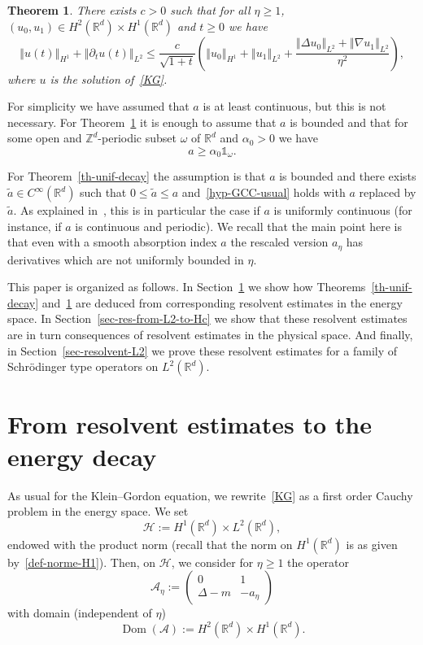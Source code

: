 \documentclass[11pt]{article}
\newtheorem{theo}{Theorem}[section]
\theoremstyle{definition}
\numberwithin{equation}{section}
\numberwithin{figure}{section}
\numberwithin{table}{section}
\newcommand{\nr}[1]{\left\Vert #1\right\Vert}
\renewcommand{\leq}{\leqslant}
\renewcommand{\geq}{\geqslant}
\newcommand{\1}{\mathds 1}
\DeclareMathOperator{\Dom}{Dom}
\newcommand{\R}{\mathbb{R}}
\renewcommand{\a}{\alpha}
\newcommand{\D}{\Delta}
\renewcommand{\o}{\omega}
\newcommand{\Ac}{{\mathcal A}}
\newcommand{\HH}{\mathcal H}
\begin{document}
\begin{theo}\label{th-no-GCC}
There exists $c > 0$ such that for all $\eta \geq 1$, $(u_0,u_1) \in H^2(\R^d) \times H^1(\R^d)$ and $t \geq 0$ we have
\[
\nr{u(t)}_{H^1} + \nr{\partial_t u(t)}_{L^2} \leq \frac c {\sqrt {1+t}} \left(\nr{u_0}_{H^1} + \nr{u_1}_{L^2} + \frac {\nr{\D u_0}_{L^2} + \nr{\nabla u_1}_{L^2}}{\eta^2} \right),
\]
where $u$ is the solution of~\eqref{KG}.
\end{theo}

For simplicity we have assumed that $a$ is at least continuous, but this is not necessary. For Theorem~\ref{th-no-GCC} it is enough to assume that $a$ is bounded and that for some open and $\mathbb Z^d$-periodic subset $\o$ of $\R^d$ and $\a_0 > 0$ we have
\begin{equation}\label{hyp-minor-a}
a \geq \a_0 \1_{\o}.
\end{equation}

For Theorem~\ref{th-unif-decay} the assumption is that $a$ is bounded and there exists $\tilde a \in C^\infty(\R^d)$ such that $0 \leq \tilde a \leq a$ and~\eqref{hyp-GCC-usual} holds with $a$ replaced by $\tilde a$. As explained in~\cite{BurqJo}, this is in particular the case if $a$ is uniformly continuous (for instance, if $a$ is continuous and periodic). We recall that the main point here is that even with a smooth absorption index $a$ the rescaled version $a_\eta$ has derivatives which are not uniformly bounded in $\eta$.%

\goodbreak
This paper is organized as follows. In Section~\ref{sec-resolvent-to-time} we show how Theorems~\ref{th-unif-decay} and~\ref{th-no-GCC} are deduced from corresponding resolvent estimates in the energy space. In Section~\ref{sec-res-from-L2-to-Hc} we show that these resolvent estimates are in turn consequences of resolvent estimates in the physical space. And finally, in Section~\ref{sec-resolvent-L2} we prove these resolvent estimates for a family of Schr\"odinger type operators on $L^2(\R^d)$.


\section{From resolvent estimates to the energy decay} \label{sec-resolvent-to-time}

As usual for the Klein--Gordon equation, we rewrite~\eqref{KG} as a first order Cauchy problem in the energy space. We set
\[
\HH := H^1(\R^d) \times L^2(\R^d),
\]
endowed with the product norm (recall that the norm on $H^1(\R^d)$ is as given by~\eqref{def-norme-H1}). Then, on $\HH$, we consider for $\eta \geq 1$ the operator
\[
\Ac_\eta :=
\begin{pmatrix}
0 & 1 \\
\D - m & -a_\eta
\end{pmatrix}
\]
with domain (independent of $\eta$)
\[
\Dom(\Ac) := H^2(\R^d) \times H^1(\R^d).
\]
\end{document}
